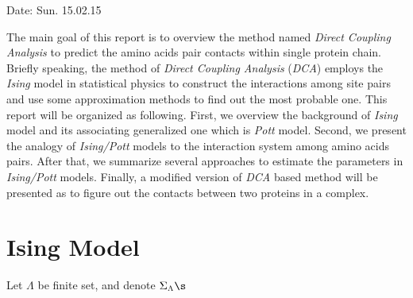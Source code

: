 \documentclass[a4paper,12pt]{article}
\begin{document}
Date: Sun. 15.02.15

The main goal of this report is to overview the method named \emph {Direct Coupling Analysis} to predict the amino acids pair contacts within single protein chain. Briefly speaking, the method of \emph {Direct Coupling Analysis} (\emph{DCA}) employs the \emph {Ising} model in statistical physics to construct the interactions among site pairs and use some approximation methods to find out the most probable one. This report will be organized as following. First, we overview the background of \emph {Ising} model and its associating generalized one which is \emph {Pott} model. Second, we present the analogy of \emph {Ising/Pott} models to the interaction system among amino acids pairs. After that, we summarize several approaches to estimate the parameters in \emph {Ising/Pott} models. Finally, a modified version of \emph {DCA} based method will be presented as to figure out the contacts between two proteins in a complex. 

\section{Ising Model}
Let $ \Lambda $ be finite set, and denote $ \Sigma_\Lambda \s $
\end{document}

